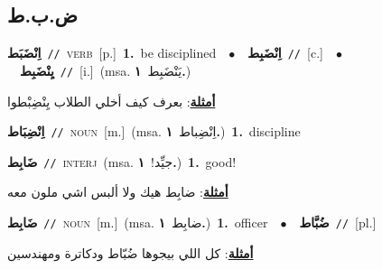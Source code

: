 \documentclass[10pt,a4paper,twoside]{article} %
\begin{document}
\begin{multicols}{2}
\vspace{-3mm}
\subsection*{\color{blue}\foreignlanguage{arabic}{ض.ب.ط}\color{blue}{}} 

{\setlength\topsep{0pt}\textbf{\foreignlanguage{arabic}{اِنْضَبَط}}\ {\color{gray}\texttt{//}\color{black}}\ \textsc{verb}\ [p.]\ \textbf{1.}~be disciplined\ \ $\bullet$\ \ \setlength\topsep{0pt}\textbf{\foreignlanguage{arabic}{اِنْضَبِط}}\ {\color{gray}\texttt{//}\color{black}}\ [c.]\ \ $\bullet$\ \ \setlength\topsep{0pt}\textbf{\foreignlanguage{arabic}{يِنْضَبِط}}\ {\color{gray}\texttt{//}\color{black}}\ [i.]\ \color{gray}(msa. \foreignlanguage{arabic}{يَنْضَبِط}~\foreignlanguage{arabic}{\textbf{١.}})\color{black}\  \begin{flushright}\color{gray}\foreignlanguage{arabic}{\textbf{\underline{\foreignlanguage{arabic}{أمثلة}}}: بعرف كيف أخلي الطلاب يِنْضِبْطوا}\end{flushright}\color{black}} \vspace{2mm}

{\setlength\topsep{0pt}\textbf{\foreignlanguage{arabic}{اِنْضِبَاط}}\ {\color{gray}\texttt{//}\color{black}}\ \textsc{noun}\ [m.]\ \color{gray}(msa. \foreignlanguage{arabic}{اِنْضِباط}~\foreignlanguage{arabic}{\textbf{١.}})\color{black}\ \textbf{1.}~discipline\ } \vspace{2mm}

{\setlength\topsep{0pt}\textbf{\foreignlanguage{arabic}{ضَابِط}}\ {\color{gray}\texttt{//}\color{black}}\ \textsc{interj}\ \color{gray}(msa. \foreignlanguage{arabic}{جيِّد!}~\foreignlanguage{arabic}{\textbf{١.}})\color{black}\ \textbf{1.}~good!\  \begin{flushright}\color{gray}\foreignlanguage{arabic}{\textbf{\underline{\foreignlanguage{arabic}{أمثلة}}}: ضابِط هيك ولا ألبس اشي ملون معه}\end{flushright}\color{black}} \vspace{2mm}

{\setlength\topsep{0pt}\textbf{\foreignlanguage{arabic}{ضَابِط}}\ {\color{gray}\texttt{//}\color{black}}\ \textsc{noun}\ [m.]\ \color{gray}(msa. \foreignlanguage{arabic}{ضابِط}~\foreignlanguage{arabic}{\textbf{١.}})\color{black}\ \textbf{1.}~officer\ \ $\bullet$\ \ \setlength\topsep{0pt}\textbf{\foreignlanguage{arabic}{ضُبَّاط}}\ {\color{gray}\texttt{//}\color{black}}\ [pl.]\  \begin{flushright}\color{gray}\foreignlanguage{arabic}{\textbf{\underline{\foreignlanguage{arabic}{أمثلة}}}: كل اللي بيجوها ضُبّاط ودكاترة ومهندسين}\end{flushright}\color{black}} \vspace{2mm}


\end{multicols}
\end{document}
